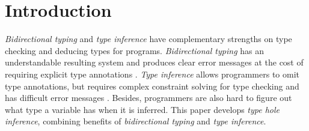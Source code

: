 



\section{Introduction}
\label{sec:intro}
\emph{Bidirectional typing} and \emph{type inference} have complementary strengths on type checking and deducing types for programs. \emph{Bidirectional typing} has an understandable resulting system and produces clear error messages at the cost of requiring explicit type annotations \cite{BidirTyping}. \emph{Type inference} allows programmers to omit type annotations, but requires complex constraint solving for type checking and has difficult error messages \cite{typeinferDif}. Besides, programmers are also hard to figure out what type a variable has when it is inferred. This paper develops \emph{type hole inference}, combining benefits of \emph{bidirectional typing} and \emph{type inference}.\par

